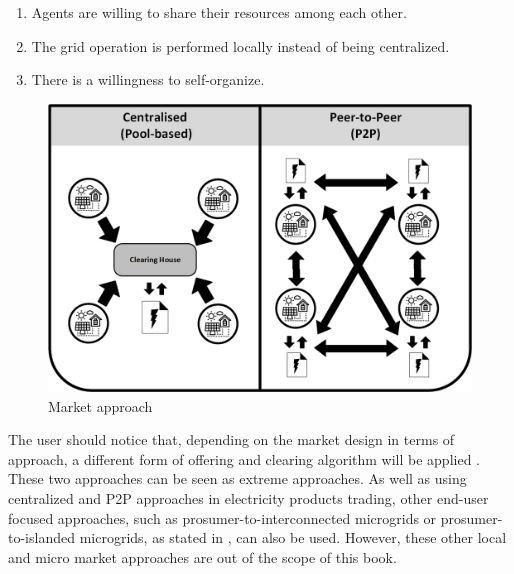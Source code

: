 \begin{enumerate}
\item Agents are willing to share their resources among each other.
\item The grid operation is performed locally instead of being centralized.
\item There is a willingness to self-organize.
\end{enumerate}

\begin{figure}[]
	\centering
	\includegraphics[width=0.4\columnwidth ]{ChapterIntro/Figures/CENTRALISED_P2P.jpg}
		\caption{Market approach}
	\label{fig:POOL_P2P}  
\end{figure}


The user should notice that, depending on the market design in terms of approach, a different form of offering and clearing algorithm will be applied \cite{Pinson2017}. These two approaches can be seen as extreme approaches. As well as using centralized and P2P approaches in electricity products trading, other end-user focused approaches, such as prosumer-to-interconnected microgrids or prosumer-to-islanded microgrids, as stated in \cite{parag2016electricity}, can also be used. However, these other local and micro market approaches are out of the scope of this book.

